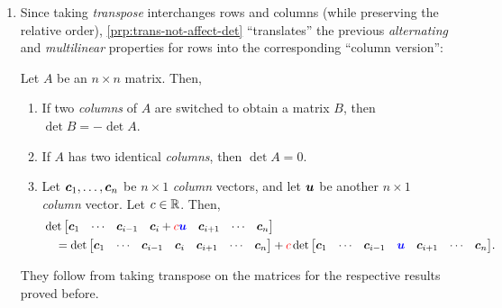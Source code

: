 \begin{enumerate}
\item Since taking \emph{transpose} interchanges rows and columns (while
preserving the relative order), \cref{prp:trans-not-affect-det} ``translates''
the previous \emph{alternating} and \emph{multilinear} properties for rows
into the corresponding ``column version'':
\begin{proposition}
\label{prp:det-alter-multilinear-col-version}
Let \(A\) be an \(n\times n\) matrix. Then,
\begin{enumerate}
\item \label{it:det-alter-col}If two \emph{columns} of \(A\) are switched to obtain a matrix \(B\), then \(\det B=-\det A\).
\item \label{it:two-identical-cols-zero-det}If \(A\) has two identical \emph{columns}, then \(\det A=0\).
\item\label{it:det-multilinear-col} Let \(\vb*{c}_{1},\dotsc,\vb*{c}_{n}\) be \(n\times 1\) \emph{column}
vectors, and let \(\vb*{u}\) be another \(n\times 1\) \emph{column} vector.
Let \(c\in\mathbb{R}\). Then,
\begin{align*}
&\det\mqty[\vect{c}_{1}&\cdots& \vect{c}_{i-1}& \vect{c}_{i}+\rc{c}\blc{\vect{u}}&
\vect{c}_{i+1}& \cdots& \vect{c}_{n}]\\
&\quad=
\det\mqty[\vect{c}_{1}&\cdots& \vect{c}_{i-1}& \vect{c}_{i}&
\vect{c}_{i+1}& \cdots& \vect{c}_{n}]
+\rc{c}\det\mqty[\vect{c}_{1}&\cdots& \vect{c}_{i-1}& \blc{\vect{u}}&
\vect{c}_{i+1}& \cdots& \vect{c}_{n}].
\end{align*}
\end{enumerate}
\end{proposition}
\begin{pf}
They follow from taking transpose on the matrices for the respective results
proved before.
\end{pf}


\end{enumerate}
